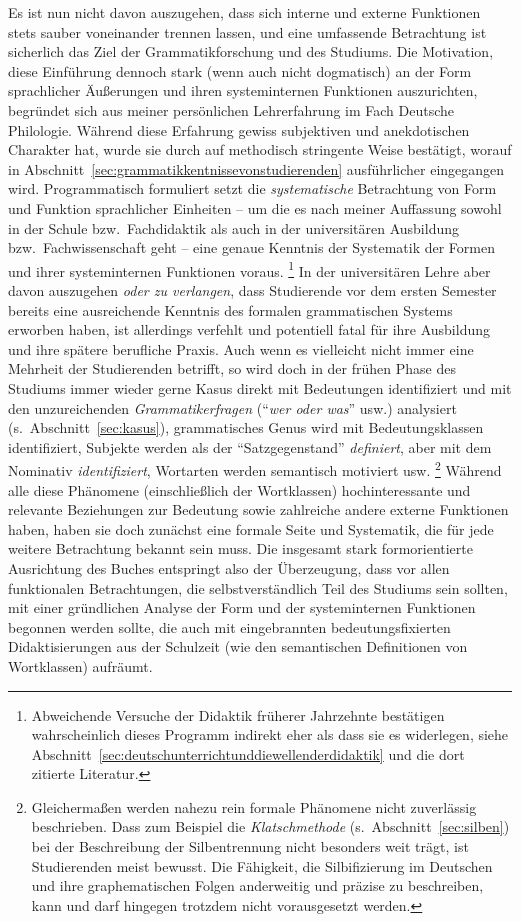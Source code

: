 Es ist nun nicht davon auszugehen, dass sich interne und externe Funktionen stets sauber voneinander trennen lassen, und eine umfassende Betrachtung ist sicherlich das Ziel der Grammatikforschung und des Studiums.
Die Motivation, diese Einführung dennoch stark (wenn auch nicht dogmatisch) an der Form sprachlicher Äußerungen und ihren systeminternen Funktionen auszurichten, begründet sich aus meiner persönlichen Lehrerfahrung im Fach Deutsche Philologie.
Während diese Erfahrung gewiss subjektiven und anekdotischen Charakter hat, wurde sie durch \citet{SchaeferSayatz2017a} auf methodisch stringente Weise bestätigt, worauf in Abschnitt~\ref{sec:grammatikkentnissevonstudierenden} ausführlicher eingegangen wird.
Programmatisch formuliert setzt die \textit{systematische} Betrachtung von Form und Funktion sprachlicher Einheiten -- um die es nach meiner Auffassung sowohl in der Schule bzw.\ Fachdidaktik als auch in der universitären Ausbildung bzw.\ Fachwissenschaft geht -- eine genaue Kenntnis der Systematik der Formen und ihrer systeminternen Funktionen voraus.%
\footnote{Abweichende Versuche der Didaktik früherer Jahrzehnte bestätigen wahrscheinlich dieses Programm indirekt eher als dass sie es widerlegen, siehe Abschnitt~\ref{sec:deutschunterrichtunddiewellenderdidaktik} und die dort zitierte Literatur.}
In der universitären Lehre aber davon auszugehen \textit{oder zu verlangen}, dass Studierende vor dem ersten Semester bereits eine ausreichende Kenntnis des formalen grammatischen Systems erworben haben, ist allerdings verfehlt und potentiell fatal für ihre Ausbildung und ihre spätere berufliche Praxis.
Auch wenn es vielleicht nicht immer eine Mehrheit der Studierenden betrifft, so wird doch in der frühen Phase des Studiums immer wieder gerne Kasus direkt mit Bedeutungen identifiziert und mit den unzureichenden \textit{Grammatikerfragen} ("`\textit{wer oder was}"' usw.) analysiert (s.\ Abschnitt~\ref{sec:kasus}), grammatisches Genus wird mit Bedeutungsklassen identifiziert, Subjekte werden als der "`Satzgegenstand"' \textit{definiert}, aber mit dem Nominativ \textit{identifiziert}, Wortarten werden semantisch motiviert usw.%
\footnote{Gleichermaßen werden nahezu rein formale Phänomene nicht zuverlässig beschrieben.
Dass zum Beispiel die \textit{Klatschmethode} (s.\ Abschnitt~\ref{sec:silben}) bei der Beschreibung der Silbentrennung nicht besonders weit trägt, ist Studierenden meist bewusst.
Die Fähigkeit, die Silbifizierung im Deutschen und ihre graphematischen Folgen anderweitig und präzise zu beschreiben, kann und darf hingegen trotzdem nicht vorausgesetzt werden.}
Während alle diese Phänomene (einschließlich der Wortklassen) hochinteressante und relevante Beziehungen zur Bedeutung sowie zahlreiche andere externe Funktionen haben, haben sie doch zunächst eine formale Seite und Systematik, die für jede weitere Betrachtung bekannt sein muss.
Die insgesamt stark formorientierte Ausrichtung des Buches entspringt also der Überzeugung, dass vor allen funktionalen Betrachtungen, die selbstverständlich Teil des Studiums sein sollten, mit einer gründlichen Analyse der Form und der systeminternen Funktionen begonnen werden sollte, die auch mit eingebrannten bedeutungsfixierten Didaktisierungen aus der Schulzeit (wie den semantischen Definitionen von Wortklassen) aufräumt.

